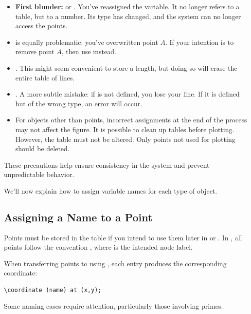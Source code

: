 \begin{itemize}
  \item \textbf{First blunder:}  or . You've reassigned the  variable. It no longer refers to a table, but to a number. Its type has changed, and the system can no longer access the points.
  \item {} is equally problematic: you’ve overwritten point $A$. If your intention is to remove point $A$, then use  instead.
  \item {}. This might seem convenient to store a length, but doing so will erase the entire table of lines.
  \item {}. A more subtle mistake: if  is not defined, you lose your line. If it is defined but of the wrong type, an error will occur.
  \item For objects other than points, incorrect assignments at the end of the process may not affect the figure. It is possible to clean up tables before plotting. However, the  table must not be altered. Only points not used for plotting should be deleted.
\end{itemize}

These precautions help ensure consistency in the system and prevent unpredictable behavior.

\vspace{1em}
We’ll now explain how to assign variable names for each type of object.


\subsection{Assigning a Name to a Point}

Points must be stored in the table  if you intend to use them
later in \tkzNamePack{\TIKZ} or .
In , all points follow the convention
, where  is the intended node label.

\medskip
When transferring points to \TIKZ{} using ,
each entry  produces the corresponding coordinate:

\begin{mybox}
\verb|\coordinate (name) at (x,y);|
\end{mybox}

Some naming cases require attention, particularly those involving primes.

